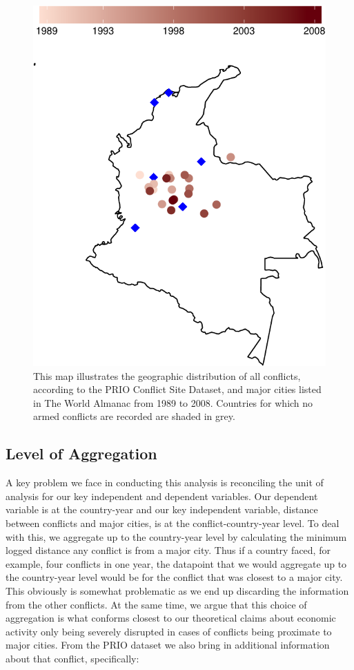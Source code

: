 \begin{figure}[ht]
	\centering
	\includegraphics[width=.5\textwidth]{colombiaMap-crop}
	\caption{This map illustrates the geographic distribution of all conflicts, according to the PRIO Conflict Site Dataset, and major cities listed in The World Almanac from 1989 to 2008. Countries for which no armed conflicts are recorded are shaded in grey.}
	\label{fig:columbiaMap}
\end{figure}

\subsection{Level of Aggregation}

A key problem we face in conducting this analysis is reconciling the unit of analysis for our key independent and dependent variables. Our dependent variable is at the country-year and our key independent variable, distance between conflicts and major cities, is at the conflict-country-year level. To deal with this, we aggregate up to the country-year level by calculating the minimum logged distance any conflict is from a major city. Thus if a country faced, for example, four conflicts in one year, the datapoint that we would aggregate up to the country-year level would be for the conflict that was closest to a major city. This obviously is somewhat problematic as we end up discarding the information from the other conflicts. At the same time, we argue that this choice of aggregation is what conforms closest to our theoretical claims about economic activity only being severely disrupted in cases of conflicts being proximate to major cities. From the PRIO dataset we also bring in additional information about that conflict, specifically: 

